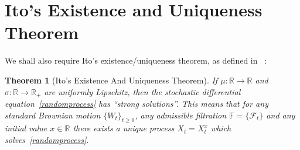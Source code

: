 \documentclass[11pt]{article} %
\newtheorem{theorem}{Theorem}[section]
\begin{document}
\section{Ito's Existence and Uniqueness Theorem}
We shall also require Ito's existence/uniqueness theorem, as defined in 
~\cite{SDE}:

\begin{theorem}[Ito's Existence And Uniqueness Theorem]\label{isosexistence}
    If $\mu : \mathbb{R} \to \mathbb{R}$ and $\sigma : \mathbb{R} \to \mathbb{R}_+$ 
    are uniformly Lipschitz, then the stochastic differential equation~\eqref{randomprocess} has 
    ``strong solutions''. This means that for any standard 
    Brownian motion ${\{W_t\}}_{t\geq0}$, any admissible filtration $\mathbb{F} = 
    \{\mathcal{F}_t\}$ and any initial value $x \in \mathbb{R}$ there exists a 
    unique process $X_t = X_t^x$ which solves~\eqref{randomprocess}. 

    
\end{theorem}
\end{document}
